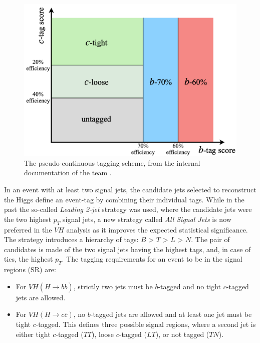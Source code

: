 \begin{figure}[h!]
\center
\includegraphics[scale=0.45]{Images/VH/pseudocontinuous.png}
\caption{The pseudo-continuous tagging scheme, from the internal documentation of the team \cite{Chisholm:2743096}. } 
\label{fig:pseudotag}
\end{figure}

In an event with at least two signal jets, the candidate jets selected to reconstruct the Higgs define an event-tag by combining their individual tags. While in the past the so-called \textit{Leading 2-jet} strategy was used, where the candidate jets were the two highest $p_T$ signal jets, a new strategy called \textit{All Signal Jets} is now preferred in the $VH$ analysis as it improves the expected statistical significance. The strategy introduces a hierarchy of tags: $B$ > $T$ > $L$ > $N$. The pair of candidates is made of the two signal jets having the highest tags, and, in case of ties, the highest $p_T$. The tagging requirements for an event to be in the signal regions (SR) are:
\begin{itemize}
\item For $VH(H\rightarrow b\bar{b})$, strictly two jets must be $b$-tagged and no tight $c$-tagged jets are allowed. 
\item For $VH(H\rightarrow c\bar{c})$, no $b$-tagged jets are allowed and at least one jet must be tight $c$-tagged. This defines three possible signal regions, where a second jet is either tight $c$-tagged ($TT$), loose $c$-tagged ($LT$), or not tagged ($TN$). 
\end{itemize}


